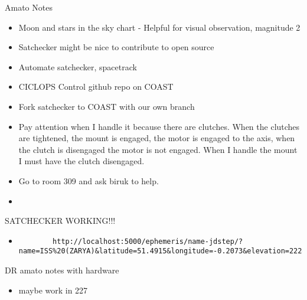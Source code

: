 \documentclass[../main.tex]{subfiles}
\begin{document}
    Amato Notes
    \begin{itemize}
        \item Moon and stars in the sky chart - Helpful for visual observation, magnitude 2
        \item Satchecker might be nice to contribute to open source
        \item Automate satchecker, spacetrack
        \item CICLOPS Control github repo on COAST
        \item Fork satchecker to COAST with our own branch
        \item Pay attention when I handle it because there are clutches. When the clutches are tightened, the mount is engaged, the motor is engaged to the axis, when the clutch is disengaged the motor is not engaged. When I handle the mount I must have the clutch disengaged.
        \item Go to room 309 and ask biruk to help.
        \item 
\end{itemize}
SATCHECKER WORKING!!!
\begin{itemize}
    \item \begin{lstlisting}
        http://localhost:5000/ephemeris/name-jdstep/?name=ISS%20(ZARYA)&latitude=51.4915&longitude=-0.2073&elevation=222&startjd=2460871&stopjd=2460872&stepjd=0.01
    \end{lstlisting}
\end{itemize}
DR amato notes with hardware
\begin{itemize}
    \item maybe work in 227
\end{itemize}
\end{document}
